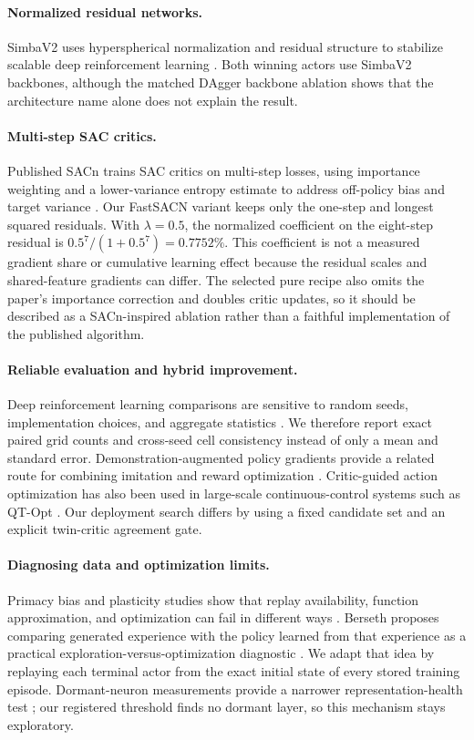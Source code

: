 \documentclass[10pt,twocolumn]{article}
\begin{document}
\paragraph{Normalized residual networks.}
SimbaV2 uses hyperspherical normalization and residual structure to stabilize scalable deep reinforcement learning \cite{lee2025simba}. Both winning actors use SimbaV2 backbones, although the matched DAgger backbone ablation shows that the architecture name alone does not explain the result.

\paragraph{Multi-step SAC critics.}
Published SACn trains SAC critics on multi-step losses, using importance weighting and a lower-variance entropy estimate to address off-policy bias and target variance \cite{lyskawa2025sacn}. Our FastSACN variant keeps only the one-step and longest squared residuals. With $\lambda=0.5$, the normalized coefficient on the eight-step residual is $0.5^7/(1+0.5^7)=0.7752\%$. This coefficient is not a measured gradient share or cumulative learning effect because the residual scales and shared-feature gradients can differ. The selected pure recipe also omits the paper's importance correction and doubles critic updates, so it should be described as a SACn-inspired ablation rather than a faithful implementation of the published algorithm.

\paragraph{Reliable evaluation and hybrid improvement.}
Deep reinforcement learning comparisons are sensitive to random seeds, implementation choices, and aggregate statistics \cite{henderson2018matters,agarwal2021precipice}. We therefore report exact paired grid counts and cross-seed cell consistency instead of only a mean and standard error. Demonstration-augmented policy gradients provide a related route for combining imitation and reward optimization \cite{rajeswaran2018dapg}. Critic-guided action optimization has also been used in large-scale continuous-control systems such as QT-Opt \cite{kalashnikov2018qtopt}. Our deployment search differs by using a fixed candidate set and an explicit twin-critic agreement gate.

\paragraph{Diagnosing data and optimization limits.}
Primacy bias and plasticity studies show that replay availability, function approximation, and optimization can fail in different ways \cite{nikishin2022primacy,nauman2024plasticity}. Berseth proposes comparing generated experience with the policy learned from that experience as a practical exploration-versus-optimization diagnostic \cite{berseth2025exploration}. We adapt that idea by replaying each terminal actor from the exact initial state of every stored training episode. Dormant-neuron measurements provide a narrower representation-health test \cite{sokar2023redo}; our registered threshold finds no dormant layer, so this mechanism stays exploratory.
\end{document}
